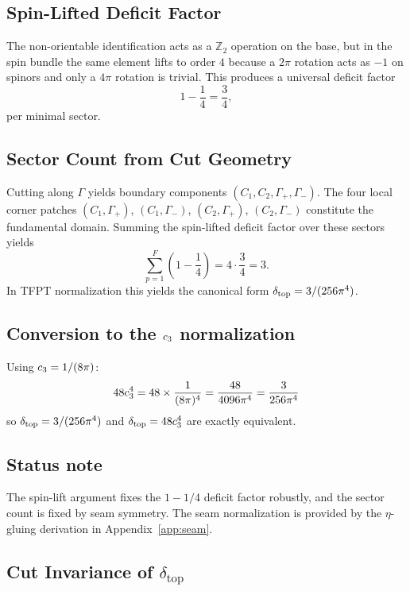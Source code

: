 \subsection{Spin-Lifted Deficit Factor}
The non-orientable identification acts as a $\mathbb{Z}_2$ operation on the base,
but in the spin bundle the same element lifts to order $4$ because a $2\pi$ rotation
acts as $-1$ on spinors and only a $4\pi$ rotation is trivial. This produces a
universal deficit factor
\begin{equation}
    1-\frac{1}{4}=\frac{3}{4},
\end{equation}
per minimal sector.

\subsection{Sector Count from Cut Geometry}
Cutting along $\Gamma$ yields boundary components $(C_1,C_2,\Gamma_+,\Gamma_-)$.
The four local corner patches
$(C_1,\Gamma_+)$, $(C_1,\Gamma_-)$, $(C_2,\Gamma_+)$, $(C_2,\Gamma_-)$
constitute the fundamental domain. Summing the spin-lifted deficit factor over these sectors yields
\begin{equation}
    \sum_{p=1}^{F}\left(1-\frac{1}{4}\right)=4\cdot\frac{3}{4}=3.
\end{equation}
In TFPT normalization this yields the canonical form $\delta_{\mathrm{top}} = 3/(256\pi^4)$.

\subsection{\texorpdfstring{Conversion to the $c_3$ normalization}{Conversion to the c3 normalization}}

Using $c_3 = 1/(8\pi)$:
\begin{equation}
    48c_3^4 = 48 \times \frac{1}{(8\pi)^4} 
    = \frac{48}{4096\pi^4}
    = \frac{3}{256\pi^4}
\end{equation}
so $\delta_{\mathrm{top}} = 3/(256\pi^4)$ and $\delta_{\mathrm{top}} = 48c_3^4$ are exactly equivalent.

\subsection{Status note}
The spin-lift argument fixes the $1-1/4$ deficit factor robustly, and the sector count
is fixed by seam symmetry. The seam normalization is provided by the $\eta$-gluing
derivation in Appendix~\ref{app:seam}.

\subsection{Cut Invariance of $\delta_{\mathrm{top}}$}
\label{sec:cut-invariance}

